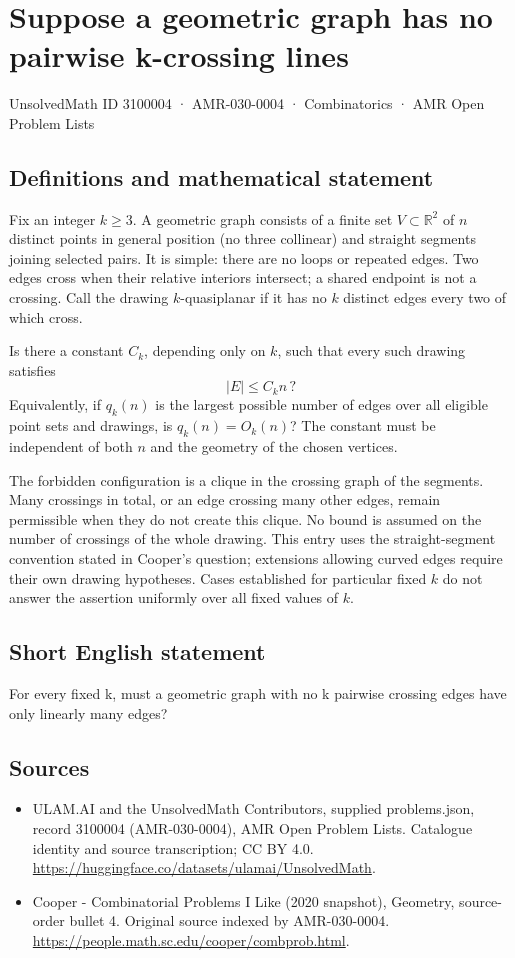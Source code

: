 \documentclass[11pt,a4paper]{article}
\begin{document}
\section*{Suppose a geometric graph has no pairwise k-crossing lines}\label{3100004}
{\small UnsolvedMath ID 3100004 · AMR-030-0004 · Combinatorics · AMR Open Problem Lists}
\subsection{Definitions and mathematical statement}
Fix an integer $k\ge3$. A geometric graph consists of a finite set
$V\subset\mathbb R^2$ of $n$ distinct points in general position
(no three collinear) and straight segments joining selected pairs.
It is simple: there are no loops or repeated edges. Two edges cross
when their relative interiors intersect; a shared endpoint is not
a crossing. Call the drawing $k$-quasiplanar if it has no $k$ distinct
edges every two of which cross.

Is there a constant $C_k$, depending only on $k$, such that every such
drawing satisfies
\[
                       |E|\le C_k n\,?
\]
Equivalently, if $q_k(n)$ is the largest possible number of edges
over all eligible point sets and drawings, is $q_k(n)=O_k(n)$?
The constant must be independent of both $n$ and the geometry of
the chosen vertices.

The forbidden configuration is a clique in the crossing graph of
the segments. Many crossings in total, or an edge crossing many
other edges, remain permissible when they do not create this clique.
No bound is assumed on the number of crossings of the whole drawing.
This entry uses the straight-segment convention stated in Cooper's
question; extensions allowing curved edges require their own drawing
hypotheses. Cases established for particular fixed $k$ do not answer
the assertion uniformly over all fixed values of $k$.
\subsection{Short English statement}
For every fixed k, must a geometric graph with no k pairwise crossing edges have only linearly many edges?
\subsection{Sources}
\begin{itemize}
\item[S1] ULAM.AI and the UnsolvedMath Contributors, supplied problems.json, record 3100004 (AMR-030-0004), AMR Open Problem Lists. Catalogue identity and source transcription; CC BY 4.0.
\url{https://huggingface.co/datasets/ulamai/UnsolvedMath}.
\item[S2] Cooper - Combinatorial Problems I Like (2020 snapshot), Geometry, source-order bullet 4. Original source indexed by AMR-030-0004.
\url{https://people.math.sc.edu/cooper/combprob.html}.
\end{itemize}
\end{document}
